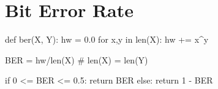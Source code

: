 \section{Bit Error Rate}


\begin{python}
def ber(X, Y):
	hw = 0.0
	for x,y in len(X):
		hw += x^y
	
	BER = hw/len(X)	# len(X) = len(Y)
	
	if 0 <= BER <= 0.5:
		return BER
	else:
		return 1 - BER
\end{python}
